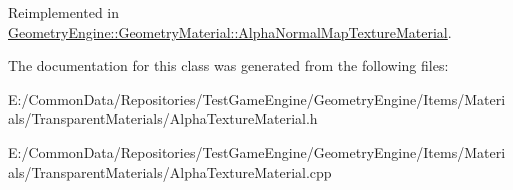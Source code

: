 Reimplemented in \mbox{\hyperlink{class_geometry_engine_1_1_geometry_material_1_1_alpha_normal_map_texture_material_a237fc12dc3eda51d90c16e95e6b2042c}{Geometry\+Engine\+::\+Geometry\+Material\+::\+Alpha\+Normal\+Map\+Texture\+Material}}.



The documentation for this class was generated from the following files\+:\begin{DoxyCompactItemize}
\item 
E\+:/\+Common\+Data/\+Repositories/\+Test\+Game\+Engine/\+Geometry\+Engine/\+Items/\+Materials/\+Transparent\+Materials/Alpha\+Texture\+Material.\+h\item 
E\+:/\+Common\+Data/\+Repositories/\+Test\+Game\+Engine/\+Geometry\+Engine/\+Items/\+Materials/\+Transparent\+Materials/Alpha\+Texture\+Material.\+cpp\end{DoxyCompactItemize}

